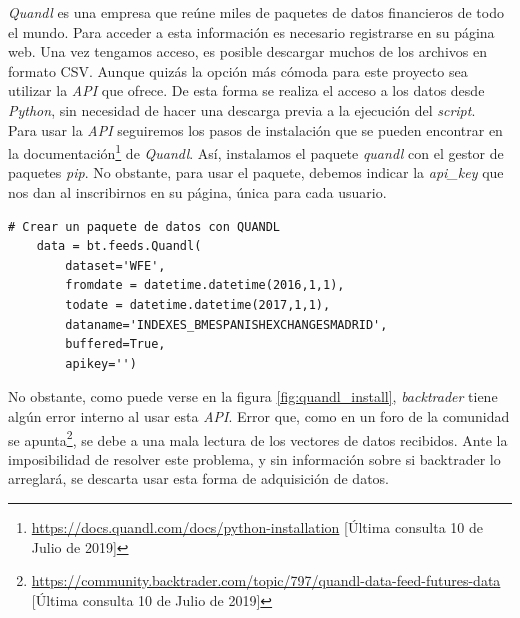 		\textit{Quandl} es una empresa que re\'une miles de paquetes de datos financieros de todo el mundo. Para acceder a esta informaci\'on es necesario registrarse en su p\'agina web. Una vez tengamos acceso, es posible descargar muchos de los archivos en formato CSV. Aunque quiz\'as la opci\'on m\'as c\'omoda para este proyecto sea utilizar la \textit{API} que ofrece. De esta forma se realiza el acceso a los datos desde \textit{Python}, sin necesidad de hacer una descarga previa a la ejecuci\'on del \textit{script}.\\
		
		Para usar la \textit{API} seguiremos los pasos de instalaci\'on que se pueden encontrar en la documentaci\'on\footnote{\url{https://docs.quandl.com/docs/python-installation} [\'Ultima consulta 10 de Julio de 2019]} de \textit{Quandl}. As\'i, instalamos el paquete \textit{quandl} con el gestor de paquetes \textit{pip}. No obstante, para usar el paquete, debemos indicar la \textit{api\_key} que nos dan al inscribirnos en su p\'agina, \'unica para cada usuario.\\
		
		\begin{lstlisting}[basicstyle=\tiny]
# Crear un paquete de datos con QUANDL
	data = bt.feeds.Quandl(
		dataset='WFE',
		fromdate = datetime.datetime(2016,1,1),
		todate = datetime.datetime(2017,1,1),
		dataname='INDEXES_BMESPANISHEXCHANGESMADRID',
		buffered=True,
		apikey='')
		\end{lstlisting}

			
			

		No obstante, como puede verse en la figura \ref{fig:quandl_install}, \textit{backtrader} tiene alg\'un error interno al usar esta \textit{API}. Error que, como en un foro de la comunidad se apunta\footnote{\url{https://community.backtrader.com/topic/797/quandl-data-feed-futures-data} [\'Ultima consulta 10 de Julio de 2019]}, se debe a una mala lectura de los vectores de datos recibidos. Ante la imposibilidad de resolver este problema, y sin informaci\'on sobre si backtrader lo arreglar\'a, se descarta usar esta forma de adquisici\'on de datos.\\
		
